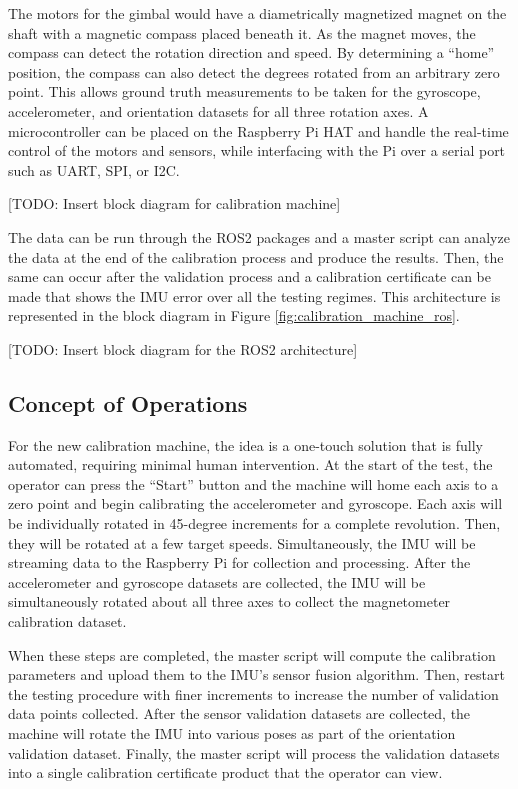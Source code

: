 The motors for the gimbal would have a diametrically magnetized magnet on the shaft with a magnetic compass placed beneath it.
As the magnet moves, the compass can detect the rotation direction and speed.
By determining a ``home'' position, the compass can also detect the degrees rotated from an arbitrary zero point.
This allows ground truth measurements to be taken for the gyroscope, accelerometer, and orientation datasets for all three rotation axes.
A microcontroller can be placed on the Raspberry Pi HAT and handle the real-time control of the motors and sensors, while interfacing with the Pi over a serial port such as UART, SPI, or I2C.

[TODO: Insert block diagram for calibration machine]

The data can be run through the ROS2 packages and a master script can analyze the data at the end of the calibration process and produce the results.
Then, the same can occur after the validation process and a calibration certificate can be made that shows the IMU error over all the testing regimes.
This architecture is represented in the block diagram in Figure \ref{fig:calibration_machine_ros}.

[TODO: Insert block diagram for the ROS2 architecture]

\subsection{Concept of Operations}
For the new calibration machine, the idea is a one-touch solution that is fully automated, requiring minimal human intervention.
At the start of the test, the operator can press the ``Start'' button and the machine will home each axis to a zero point and begin calibrating the accelerometer and gyroscope.
Each axis will be individually rotated in 45-degree increments for a complete revolution.
Then, they will be rotated at a few target speeds.
Simultaneously, the IMU will be streaming data to the Raspberry Pi for collection and processing.
After the accelerometer and gyroscope datasets are collected, the IMU will be simultaneously rotated about all three axes to collect the magnetometer calibration dataset.

When these steps are completed, the master script will compute the calibration parameters and upload them to the IMU's sensor fusion algorithm.
Then, restart the testing procedure with finer increments to increase the number of validation data points collected.
After the sensor validation datasets are collected, the machine will rotate the IMU into various poses as part of the orientation validation dataset.
Finally, the master script will process the validation datasets into a single calibration certificate product that the operator can view.

